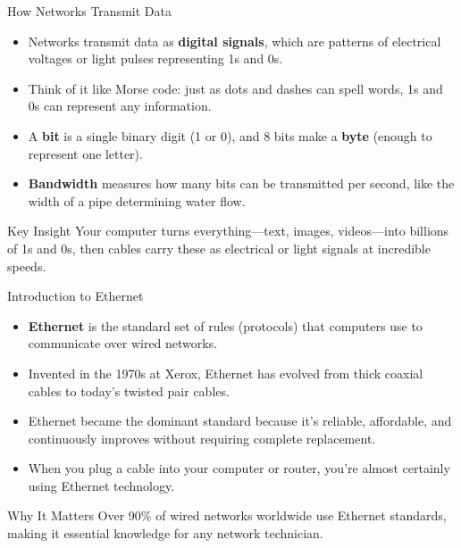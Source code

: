 \documentclass[aspectratio=169]{beamer}
\begin{document}
\begin{frame}{How Networks Transmit Data}
    \begin{itemize}
        \item Networks transmit data as \textbf{digital signals}, which are patterns of electrical voltages or light pulses representing 1s and 0s.
        \item Think of it like Morse code: just as dots and dashes can spell words, 1s and 0s can represent any information.
        \item A \textbf{bit} is a single binary digit (1 or 0), and 8 bits make a \textbf{byte} (enough to represent one letter).
        \item \textbf{Bandwidth} measures how many bits can be transmitted per second, like the width of a pipe determining water flow.
    \end{itemize}
    
    \vspace{0.5cm}
    \begin{block}{Key Insight}
        Your computer turns everything---text, images, videos---into billions of 1s and 0s, then cables carry these as electrical or light signals at incredible speeds.
    \end{block}
\end{frame}

\begin{frame}{Introduction to Ethernet}
    \begin{itemize}
        \item \textbf{Ethernet} is the standard set of rules (protocols) that computers use to communicate over wired networks.
        \item Invented in the 1970s at Xerox, Ethernet has evolved from thick coaxial cables to today's twisted pair cables.
        \item Ethernet became the dominant standard because it's reliable, affordable, and continuously improves without requiring complete replacement.
        \item When you plug a cable into your computer or router, you're almost certainly using Ethernet technology.
    \end{itemize}
    
    \vspace{0.5cm}
    \begin{alertblock}{Why It Matters}
        Over 90\% of wired networks worldwide use Ethernet standards, making it essential knowledge for any network technician.
    \end{alertblock}
\end{frame}
\end{document}

